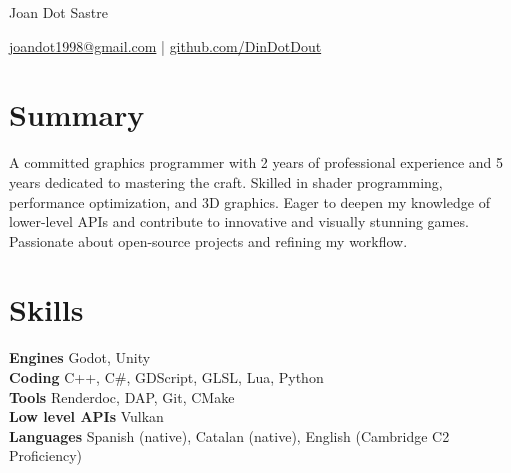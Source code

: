 \documentclass[10pt]{article}       %
\begin{document}
\centerline{\Huge Joan Dot Sastre}

\vspace{5pt}

\centerline{\href{mailto:joandot1998@gmail.com}{joandot1998@gmail.com} | \href{https://github.com/DinDotDout}{github.com/DinDotDout}}

\vspace{-10pt}
\section*{Summary}
A committed graphics programmer with 2 years of professional experience and 5 years dedicated to mastering the craft. Skilled in shader programming, performance optimization, and 3D graphics. Eager to deepen my knowledge of lower-level APIs and contribute to innovative and visually stunning games. Passionate about open-source projects and refining my workflow.
\section*{Skills}
\textbf{Engines} Godot, Unity \\
\textbf{Coding} C++, C\#, GDScript, GLSL, Lua, Python \\
\textbf{Tools} Renderdoc, DAP, Git, CMake \\
\textbf{Low level APIs} Vulkan \\
\textbf{Languages} Spanish (native), Catalan (native), English (Cambridge C2 Proficiency)

\vspace{-6.5pt}
\end{document}
